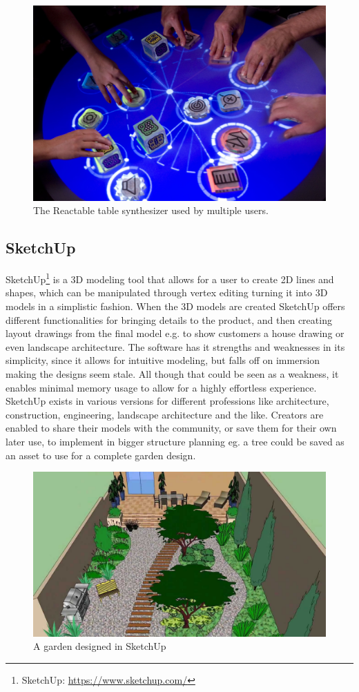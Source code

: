 				\begin{figure}[H]
					\centering
					\includegraphics[width=0.6\linewidth]{figure/Analysis/reactable}
					\caption{The Reactable table synthesizer used by multiple users.}
					\label{fig:reactable}
				\end{figure} 
		
		\subsection{SketchUp}
			SketchUp\footnote{SketchUp: \url{https://www.sketchup.com/}} is a 3D modeling tool that allows for a user to create 2D lines and shapes, which can be manipulated through vertex editing turning it into 3D models in a simplistic fashion. When the 3D models are created SketchUp offers different functionalities for bringing details to the product, and then creating layout drawings from the final	model e.g. to show customers a house drawing or even landscape architecture. The software has it strengths and weaknesses in its simplicity, since it allows for intuitive modeling, but falls off on immersion making the designs seem stale. All though that could be seen as a weakness, it enables minimal memory usage to allow for a highly effortless experience. \\
			
			SketchUp exists in various versions for different professions like architecture, construction, engineering, landscape architecture and the like. Creators are enabled to share their models with the community, or save them for their own later use, to implement in bigger structure planning eg. a tree could be saved as an asset to use for a complete garden design.
			
				\begin{figure}[H]
					\centering
					\includegraphics[width=0.6\linewidth]{figure/Analysis/sketchupgarden}
					\caption{A garden designed in SketchUp}
					\label{fig:sketchupgarden}
				\end{figure}
			
